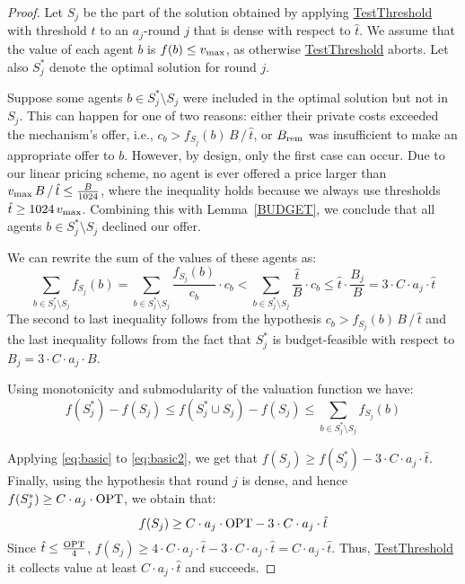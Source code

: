 \begin{proof}
Let $S_j$ be the part of the solution obtained by applying \hyperref[alg:TestTHRESHOLD]{TestThreshold} with threshold $\hat{t}$ to an $a_j$-round $j$ that is dense with respect to $\hat{t}$. We assume that the value of each agent $b$ is $f(b) \leq v_{\text{max}}$, as otherwise \hyperref[alg:TestTHRESHOLD]{TestThreshold} aborts. Let also $S^\ast_j$ denote the optimal solution for round $j$.

Suppose some agents $ b \in S_j^{*} \setminus S_j $ were included in the optimal solution but not in $S_j$. This can happen for one of two reasons: either their private costs exceeded the mechanism's offer, i.e., $ c_b > f_{S_j}(b)\,B\,/\,\hat{t}$, or $B_{\text{rem}}$ was insufficient to make an appropriate offer to $ b $. However, by design, only the first case can occur. Due to our linear pricing scheme, no agent is ever offered a price larger than $v_{\text{max}}\,B\,/\,\hat{t} \le \frac{B}{1024}$, where the inequality holds because we always use thresholds $\hat{t} \geq 1024\,v_{\text{max}}$. Combining this with Lemma~\ref{BUDGET}, we conclude that all agents $ b \in S_j^{*} \setminus S_j $ declined our offer.

We can rewrite the sum of the values of these agents as:
\begin{equation}\label{eq:basic}
            \sum_{b\in S_j^{*} \setminus S_j} f_{S_j}(b) = \sum_{b\in S_j^{*} \setminus S_j} \frac{f_{S_j}(b)}{c_b} \cdot c_b < \sum_{b\in S_j^{*} \setminus S_j}\frac{\hat{t}}{B}\cdot c_b \le \hat{t}\cdot \frac{B_j}{B} = 3 \cdot C\cdot a_j \cdot \hat{t}
\end{equation}
%
The second to last inequality follows from the hypothesis $ c_b > f_{S_j}(b)\,B\,/\,\hat{t}$ and the last inequality follows from the fact that $S_j^{*}$ is budget-feasible with respect to $B_j = 3 \cdot C\cdot a_j\cdot B$.

Using monotonicity and submodularity of the valuation function we have:
%
\begin{equation}\label{eq:basic2}
    f(S_j^{*})-f(S_j) \le f(S_j^{*}\cup S_j) -f(S_j) \le \sum_{b\in S_j^{*}\setminus S_j} f_{S_j}(b)
\end{equation}

Applying \eqref{eq:basic} to \eqref{eq:basic2}, we get that $f(S_j) \geq f(S_j^{*}) - 3 \cdot C\cdot a_j \cdot \hat{t}$. Finally, using the hypothesis that round $j$ is dense, and hence $f(S^\ast_j) \geq C \cdot a_j \cdot \mathrm{OPT}$, we obtain that:
\[
        f(S_j) \ge C \cdot a_j \cdot \mathrm{OPT} -  3\cdot C\cdot a_j \cdot \hat{t}
\]
%
Since $\hat{t} \le \frac{\mathrm{OPT}}{4}$, 
%
$f(S_j)\ge 4\cdot C \cdot a_j \cdot \hat{t} -3 \cdot C\cdot a_j\cdot\hat{t} = C\cdot a_j \cdot \hat{t}$.
%
Thus, \hyperref[alg:TestTHRESHOLD]{TestThreshold} it collects value at least $C\cdot a_j \cdot \hat{t}$ and succeeds. %
\end{proof}
